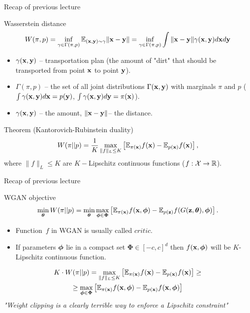 \begin{frame}{Recap of previous lecture}
		\begin{block}{Wasserstein distance}
			\vspace{-0.5cm}
			\[
				W(\pi, p) = \inf_{\gamma \in \Gamma(\pi, p)} \mathbb{E}_{(\mathbf{x}, \mathbf{y}) \sim \gamma} \| \mathbf{x} - \mathbf{y} \| =  \inf_{\gamma \in \Gamma(\pi, p)} \int \| \mathbf{x} - \mathbf{y} \| \gamma (\mathbf{x}, \mathbf{y}) d \mathbf{x} d \mathbf{y}
			\]
			\vspace{-0.5cm}
			\begin{itemize}
				\item $\gamma(\mathbf{x}, \mathbf{y})$ -- transportation plan (the amount of "dirt" that should be transported from point $\mathbf{x}$ to point $\mathbf{y}$).
				\item $\Gamma(\pi, p)$ -- the set of all joint distributions $\Gamma (\mathbf{x}, \mathbf{y})$ with marginals $\pi$ and $p$ ($\int \gamma(\mathbf{x}, \mathbf{y}) d \mathbf{x} = p(\mathbf{y})$, $\int \gamma(\mathbf{x}, \mathbf{y}) d \mathbf{y} = \pi(\mathbf{x})$).
				\item $\gamma(\mathbf{x}, \mathbf{y})$ -- the amount, $\|\mathbf{x} - \mathbf{y} \|$-- the distance.
			\end{itemize}
		\end{block}
		\begin{block}{Theorem (Kantorovich-Rubinstein duality)}
			\vspace{-0.2cm}
			\[
				W(\pi || p) = \frac{1}{K} \max_{\| f \|_L \leq K} \left[ \mathbb{E}_{\pi(\mathbf{x})} f(\mathbf{x})  - \mathbb{E}_{p(\mathbf{x})} f(\mathbf{x})\right],
			\]
			where $\| f \|_L \leq K$ are $K-$Lipschitz continuous functions ($f: \mathcal{X} \rightarrow \mathbb{R}$).
		\end{block}
\end{frame}
\begin{frame}{Recap of previous lecture}
	\begin{block}{WGAN objective}
		\vspace{-0.5cm}
		\[
		\min_{\boldsymbol{\theta}} W(\pi || p) = \min_{\boldsymbol{\theta}} \max_{\boldsymbol{\phi} \in \boldsymbol{\Phi}} \left[ \mathbb{E}_{\pi(\mathbf{x})} f(\mathbf{x}, \boldsymbol{\phi})  - \mathbb{E}_{p(\mathbf{z})} f(G(\mathbf{z}, \boldsymbol{\theta}), \boldsymbol{\phi} )\right].
		\]
		\vspace{-0.5cm}
	\end{block}
	\begin{itemize}
		\item Function~$f$ in WGAN is usually called $\textit{critic}$.
		\item If parameters $\boldsymbol{\phi}$ lie in a compact set $\boldsymbol{\Phi} \in [-c, c]^d$ then $f(\mathbf{x}, \boldsymbol{\phi})$ will be $K$-Lipschitz continuous function. 
	\end{itemize}
	\begin{multline*}
		K \cdot W(\pi || p) = \max_{\| f \|_L \leq K} \left[ \mathbb{E}_{\pi(\mathbf{x})} f(\mathbf{x})  - \mathbb{E}_{p(\mathbf{x})} f(\mathbf{x})\right] \geq \\  \geq \max_{\boldsymbol{\phi} \in \boldsymbol{\Phi}} \left[ \mathbb{E}_{\pi(\mathbf{x})} f(\mathbf{x}, \boldsymbol{\phi})  - \mathbb{E}_{p(\mathbf{x})} f(\mathbf{x}, \boldsymbol{\phi} )\right]
	\end{multline*}
	\textit{"Weight clipping is a clearly terrible way to enforce a Lipschitz constraint"}
\end{frame}
